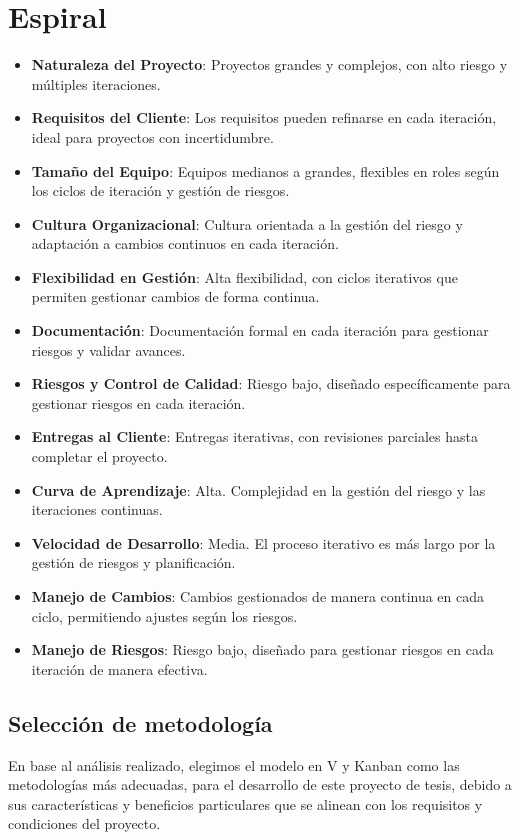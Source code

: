 \documentclass[main.tex]{subfiles}
\begin{document}
\section{Espiral}
\begin{itemize}
    \item \textbf{Naturaleza del Proyecto}: Proyectos grandes y complejos, con alto riesgo y múltiples iteraciones.
    \item \textbf{Requisitos del Cliente}: Los requisitos pueden refinarse en cada iteración, ideal para proyectos con incertidumbre.
    \item \textbf{Tamaño del Equipo}: Equipos medianos a grandes, flexibles en roles según los ciclos de iteración y gestión de riesgos.
    \item \textbf{Cultura Organizacional}: Cultura orientada a la gestión del riesgo y adaptación a cambios continuos en cada iteración.
    \item \textbf{Flexibilidad en Gestión}: Alta flexibilidad, con ciclos iterativos que permiten gestionar cambios de forma continua.
    \item \textbf{Documentación}: Documentación formal en cada iteración para gestionar riesgos y validar avances.
    \item \textbf{Riesgos y Control de Calidad}: Riesgo bajo, diseñado específicamente para gestionar riesgos en cada iteración.
    \item \textbf{Entregas al Cliente}: Entregas iterativas, con revisiones parciales hasta completar el proyecto.
    \item \textbf{Curva de Aprendizaje}: Alta. Complejidad en la gestión del riesgo y las iteraciones continuas.
    \item \textbf{Velocidad de Desarrollo}: Media. El proceso iterativo es más largo por la gestión de riesgos y planificación.
    \item \textbf{Manejo de Cambios}: Cambios gestionados de manera continua en cada ciclo, permitiendo ajustes según los riesgos.
    \item \textbf{Manejo de Riesgos}: Riesgo bajo, diseñado para gestionar riesgos en cada iteración de manera efectiva.
\end{itemize}


\subsection{Selección de metodología}

En base al análisis realizado, elegimos el modelo en V y Kanban como las metodologías más adecuadas, para el desarrollo de este proyecto de tesis, debido a sus características y beneficios particulares que se alinean con los requisitos y condiciones del proyecto.
\end{document}
